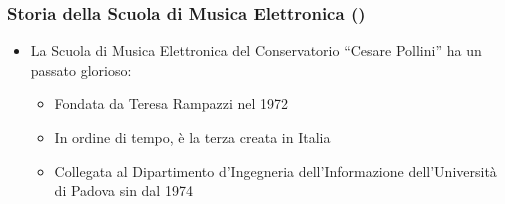 %
%
%

\setcounter{ms}{0}
\begin{frame}
    \frametitle<+->{Storia della Scuola di Musica Elettronica ()}

	\begin{itemize}[<+- | alert@+->]

		\item La Scuola di Musica Elettronica del Conservatorio ``Cesare Pollini''
    ha un passato glorioso:

      \begin{itemize}[<+- | alert@+->]

        \item Fondata da Teresa Rampazzi nel 1972

        \item In ordine di tempo, \`e la terza creata in Italia 

        \item Collegata al Dipartimento d'Ingegneria dell'Informazione
        dell'Universit\`a di Padova sin dal 1974

     \end{itemize}

	\end{itemize}

\end{frame}


